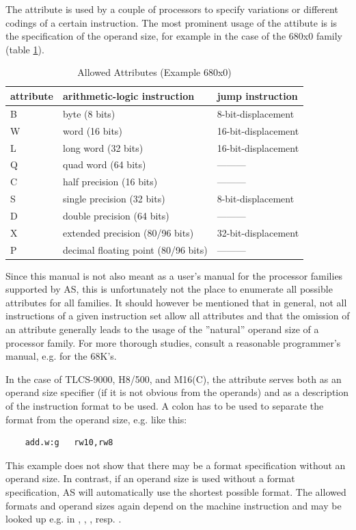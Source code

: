 \documentclass[12pt,twoside]{report}
\newcommand{\asname}{{AS}}
\begin{document}
The attribute is used by a couple of processors to specify variations or
different codings of a certain instruction.  The most prominent usage of
the attibute is is the specification of the operand size, for example in
the case of the 680x0 family (table \ref{TabAttrs}).
\begin{table}[htb]
\begin{center}\begin{tabular}{|l|l|l|}
\hline
attribute & arithmetic-logic instruction & jump instruction\\
\hline
\hline
B     & byte (8 bits)                       &  8-bit-displacement \\
W     & word (16 bits)                      &  16-bit-displacement \\
L     & long word (32 bits)                 &  16-bit-displacement \\
Q     & quad word (64 bits)                 &  --------- \\
C     & half precision (16 bits)            &  --------- \\
S     & single precision (32 bits)          &  8-bit-displacement \\
D     & double precision (64 bits)          &  --------- \\
X     & extended precision (80/96 bits)     &  32-bit-displacement \\
P     & decimal floating point (80/96 bits) &  --------- \\
\hline
\end{tabular}\end{center}
\caption{Allowed Attributes (Example 680x0) \label{TabAttrs}}
\end{table}
\par
Since this manual is not also meant as a user's manual for the processor
families supported by \asname{}, this is unfortunately not the place to enumerate
all possible attributes for all families.  It should however be mentioned
that in general, not all instructions of a given instruction set allow all
attributes and that the omission of an attribute generally leads to the
usage of the ''natural'' operand size of a processor family. For more
thorough studies, consult a reasonable programmer's manual, e.g.
\cite{Williams} for the 68K's.

In the case of TLCS-9000, H8/500, and M16(C), the attribute serves
both as an operand size specifier (if it is not obvious from the
operands) and as a description of the instruction format to be used.
A colon has to be used to separate the format from the operand size,
e.g. like this:
\begin{verbatim}
    add.w:g   rw10,rw8
\end{verbatim}
This example does not show that there may be a format specification
without an operand size.  In contrast, if an operand size is used
without a format specification, \asname{} will automatically use the
shortest possible format.  The allowed formats and operand sizes
again depend on the machine instruction and may be looked up e.g. in
\cite{Tosh900}, \cite{HitH8_5}, \cite{MitM16}, resp. \cite{MitM16C}.
\end{document}
